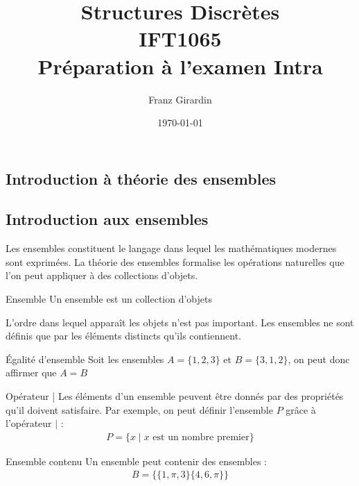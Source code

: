 \documentclass[8pt]{report}
\title{\Huge{Structures Discrètes}\\{IFT1065}\\{\textbf{Préparation à l'examen Intra}}}
\author{\huge{Franz Girardin}}
\date{\today}
\begin{document}
\maketitle
\pagebreak
\tableofcontents
\pagebreak









\begin{multicols*}{2}
\chapter{Introduction à théorie des ensembles}
\section{Introduction aux ensembles}

Les ensembles constituent le langage dans lequel les mathématiques modernes sont exprimées. La théorie des 
ensembles formalise les opérations naturelles que l'on peut appliquer à des collections d'objets. 
\begin{Definition}{Ensemble}{}
    Un ensemble est un collection d'objets
\end{Definition}
\begin{Remarque}{}{}
  L'ordre dans lequel apparaît les objets n'est pas important. Les ensembles ne sont définis que par 
  les éléments distincts qu'ils contiennent. 
\end{Remarque}

\begin{EExample}{Égalité d'ensemble}{}
  Soit les ensembles $A = \{ 1, 2, 3 \}$ et $B = \{ 3, 1, 2 \}$, on peut donc affirmer que $A = B$ 
\end{EExample}
\begin{Syntaxe*}{Opérateur |}{}
  Les éléments d'un ensemble peuvent être donnés par des propriétés qu'il doivent satisfaire. Par exemple,
  on peut définir l'ensemble $P$ grâce à l'opérateur $|$ : 
  \begin{align*}
      P = \{ x \; | \; x \text{ est un nombre premier}  \}
  \end{align*}
\end{Syntaxe*}
\begin{Remarque}{Ensemble contenu}{}
    Un ensemble peut contenir des ensembles : 
    \begin{align}
      B = \{ \{1, \pi, 3 \} \{4, 6, \pi\}\}
    \end{align}


\end{Remarque}
\end{multicols*}
\end{document}
